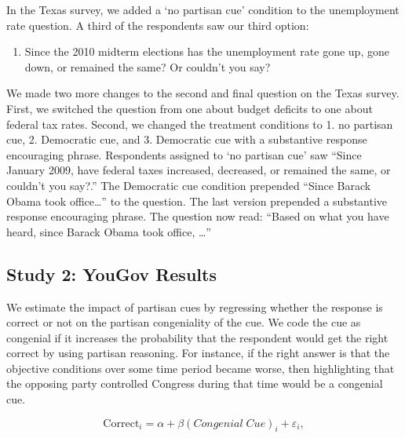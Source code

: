\documentclass[12pt, letterpaper]{article}
\begin{document}
In the Texas survey, we added a `no partisan cue' condition to the unemployment rate question. A third of the respondents saw our third option: 

\begin{enumerate}\addtocounter{enumi}{+2}
    \item Since the 2010 midterm elections has the unemployment rate gone up, gone down, or remained the same? Or couldn't you say?
\end{enumerate}

We made two more changes to the second and final question on the Texas survey. First, we switched the question from one about budget deficits to one about federal tax rates. Second, we changed the treatment conditions to 1. no partisan cue, 2. Democratic cue, and 3. Democratic cue with a substantive response encouraging phrase. Respondents assigned to `no partisan cue' saw ``Since January 2009, have federal taxes increased, decreased, or remained the same, or couldn't you say?.'' The Democratic cue condition prepended ``Since Barack Obama took office\ldots'' to the question. The last version prepended a substantive response encouraging phrase. The question now read: ``Based on what you have heard, since Barack Obama took office, \ldots''

\subsection*{Study 2: YouGov Results}\label{subsec:yougov_results}

We estimate the impact of partisan cues by regressing whether the response is correct or not on the partisan congeniality of the cue. We code the cue as congenial if it increases the probability that the respondent would get the right correct by using partisan reasoning. For instance, if the right answer is that the objective conditions over some time period became worse, then highlighting that the opposing party controlled Congress during that time would be a congenial cue.

\begin{equation}\label{eq:pgap-yougov}
\text{Correct}_{i} = \alpha + \beta (Congenial \; Cue)_i  +\varepsilon_{i},
\end{equation}
\end{document}

